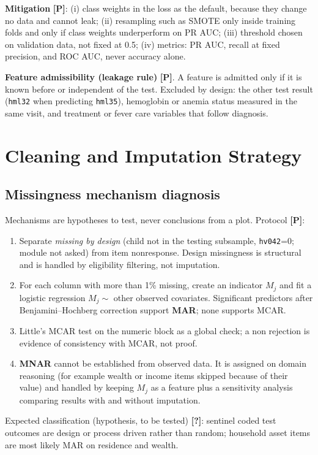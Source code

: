 \documentclass[11pt,a4paper]{article}
\newcommand{\Pl}{\textbf{[P]}}   %
\newcommand{\Q}{\textbf{[?]}}   %
\begin{document}
\textbf{Mitigation} \Pl: (i) class weights in the loss as the default, because they change no data and cannot leak; (ii) resampling such as SMOTE only inside training folds and only if class weights underperform on PR AUC; (iii) threshold chosen on validation data, not fixed at 0.5; (iv) metrics: PR AUC, recall at fixed precision, and ROC AUC, never accuracy alone.

\textbf{Feature admissibility (leakage rule)} \Pl. A feature is admitted only if it is known before or independent of the test. Excluded by design: the other test result (\texttt{hml32} when predicting \texttt{hml35}), hemoglobin or anemia status measured in the same visit, and treatment or fever care variables that follow diagnosis.

\section{Cleaning and Imputation Strategy}
\subsection{Missingness mechanism diagnosis}
Mechanisms are hypotheses to test, never conclusions from a plot. Protocol \Pl:
\begin{enumerate}
\item Separate \emph{missing by design} (child not in the testing subsample, \texttt{hv042}=0; module not asked) from item nonresponse. Design missingness is structural and is handled by eligibility filtering, not imputation.
\item For each column with more than 1\% missing, create an indicator $M_j$ and fit a logistic regression $M_j\sim$ other observed covariates. Significant predictors after Benjamini--Hochberg correction support \textbf{MAR}; none supports MCAR.
\item Little's MCAR test on the numeric block as a global check; a non rejection is evidence of consistency with MCAR, not proof.
\item \textbf{MNAR} cannot be established from observed data. It is assigned on domain reasoning (for example wealth or income items skipped because of their value) and handled by keeping $M_j$ as a feature plus a sensitivity analysis comparing results with and without imputation.
\end{enumerate}
Expected classification (hypothesis, to be tested) \Q: sentinel coded test outcomes are design or process driven rather than random; household asset items are most likely MAR on residence and wealth.
\end{document}
